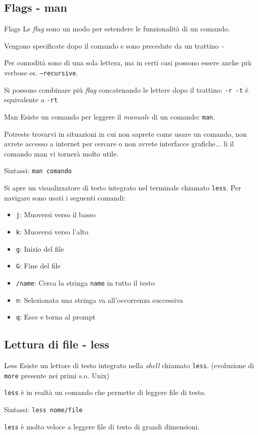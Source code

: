 \documentclass{beamer}
\begin{document}
\subsection{Flags - man}
\begin{frame}{Flags}
  Le \textit{flag} sono un modo per estendere le funzionalità di un 
  comando.\bigskip

  Vengono specificate dopo il comando e sono precedute da un trattino 
  \texttt{-}\bigskip

  Per comodità sono di una sola lettera, ma in certi casi possono essere anche 
  più verbose es. \texttt{--recursive}.\bigskip

  Si possono combinare più \textit{flag} concatenando le lettere dopo il 
  trattino: \texttt{-r -t} è equivalente a \texttt{-rt}
\end{frame}

\begin{frame}{Man}
  Esiste un comando per leggere il \textit{manuale} di un comando: 
  \texttt{man}.\bigskip

  Potreste trovarvi in situazioni in cui non saprete come usare un comando,
  non avrete accesso a internet per cercare o non avrete interfacce grafiche...
  li il comando man vi tornerà molto utile.\bigskip

  Sintassi: \texttt{man comando}\bigskip

  Si apre un visualizzatore di testo integrato nel terminale chiamato \texttt{less}.
  Per navigare sono usati i seguenti comandi:
  \begin{itemize}
    \item \texttt{j}: Muoversi verso il basso
    \item \texttt{k}: Muoversi verso l'alto
    \item \texttt{g}: Inizio del file
    \item \texttt{G}: Fine del file
    \item \texttt{/name}: Cerca la stringa \texttt{name} in tutto il testo
    \item \texttt{n}: Selezionata una stringa va all'occorrenza successiva
    \item \texttt{q}: Esce e torna al prompt
  \end{itemize}
\end{frame}

\subsection{Lettura di file - less}
\begin{frame}{Less}
  Esiste un lettore di testo integrato nella \textit{shell} chiamato 
  \texttt{less}. (evoluzione di \texttt{more} presente nei primi s.o. Unix)\bigskip

  \texttt{less} è in realtà un comando che permette di leggere file di 
  testo.\bigskip

  Sintassi: \texttt{less nome/file}\bigskip

  \texttt{less} è molto veloce a leggere file di testo di grandi dimensioni.
\end{frame}
\end{document}
